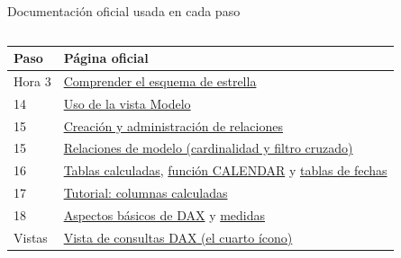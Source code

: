 \documentclass[aspectratio=169,11pt]{beamer}
\newcommand{\urlrelentender}{https://learn.microsoft.com/es-es/power-bi/transform-model/desktop-relationships-understand}
\begin{document}
\begin{frame}[t]{Documentación oficial usada en cada paso}
\begin{columns}[T,onlytextwidth]
\begin{tabular}{@{}L{1.4cm}L{4.95cm}@{}}
      \textbf{Paso} & \textbf{Página oficial} \\
      \midrule
      Hora 3 & \href{https://learn.microsoft.com/es-es/power-bi/guidance/star-schema}{\color{esumerOrange}Comprender el esquema de estrella} \\
      14 & \href{https://learn.microsoft.com/es-es/power-bi/transform-model/desktop-modeling-view}{\color{esumerOrange}Uso de la vista Modelo} \\
      15 & \href{https://learn.microsoft.com/es-es/power-bi/transform-model/desktop-create-and-manage-relationships}{\color{esumerOrange}Creación y administración de relaciones} \\
      15 & \href{\urlrelentender}{\color{esumerOrange}Relaciones de modelo (cardinalidad y filtro cruzado)} \\
      16 & \href{https://learn.microsoft.com/es-es/power-bi/transform-model/desktop-calculated-tables}{\color{esumerOrange}Tablas calculadas}, \href{https://learn.microsoft.com/es-es/dax/calendar-function-dax}{\color{esumerOrange}función CALENDAR} y \href{https://learn.microsoft.com/es-es/power-bi/transform-model/desktop-date-tables}{\color{esumerOrange}tablas de fechas} \\
      17 & \href{https://learn.microsoft.com/es-es/power-bi/transform-model/desktop-tutorial-create-calculated-columns}{\color{esumerOrange}Tutorial: columnas calculadas} \\
      18 & \href{https://learn.microsoft.com/es-es/power-bi/transform-model/desktop-quickstart-learn-dax-basics}{\color{esumerOrange}Aspectos básicos de DAX} y \href{https://learn.microsoft.com/es-es/power-bi/transform-model/desktop-measures}{\color{esumerOrange}medidas} \\
      Vistas & \href{https://learn.microsoft.com/es-es/power-bi/transform-model/dax-query-view}{\color{esumerOrange}Vista de consultas DAX (el cuarto ícono)} \\
      \bottomrule
    \end{tabular}
  \end{columns}
\end{frame}
\end{document}

